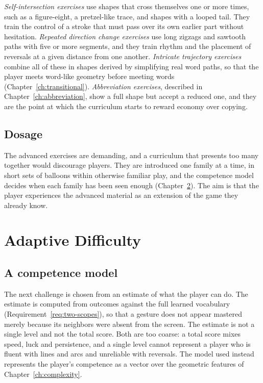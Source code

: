 \emph{Self-intersection exercises} use shapes that cross themselves one or more times, such as a figure-eight, a pretzel-like trace, and shapes with a looped tail. They train the control of a stroke that must pass over its own earlier part without hesitation. \emph{Repeated direction change exercises} use long zigzags and sawtooth paths with five or more segments, and they train rhythm and the placement of reversals at a given distance from one another. \emph{Intricate trajectory exercises} combine all of these in shapes derived by simplifying real word paths, so that the player meets word-like geometry before meeting words (Chapter~\ref{ch:transitional}). \emph{Abbreviation exercises}, described in Chapter~\ref{ch:abbreviation}, show a full shape but accept a reduced one, and they are the point at which the curriculum starts to reward economy over copying.

\section{Dosage}

The advanced exercises are demanding, and a curriculum that presents too many together would discourage players. They are introduced one family at a time, in short sets of balloons within otherwise familiar play, and the competence model decides when each family has been seen enough (Chapter~\ref{ch:adaptive-difficulty}). The aim is that the player experiences the advanced material as an extension of the game they already know.

\chapter{Adaptive Difficulty}\label{ch:adaptive-difficulty}

\section{A competence model}

The next challenge is chosen from an estimate of what the player can do. The estimate is computed from outcomes against the full learned vocabulary (Requirement~\ref{req:two-scopes}), so that a gesture does not appear mastered merely because its neighbors were absent from the screen. The estimate is not a single level and not the total score. Both are too coarse: a total score mixes speed, luck and persistence, and a single level cannot represent a player who is fluent with lines and arcs and unreliable with reversals. The model used instead represents the player's competence as a vector over the geometric features of Chapter~\ref{ch:complexity}.

